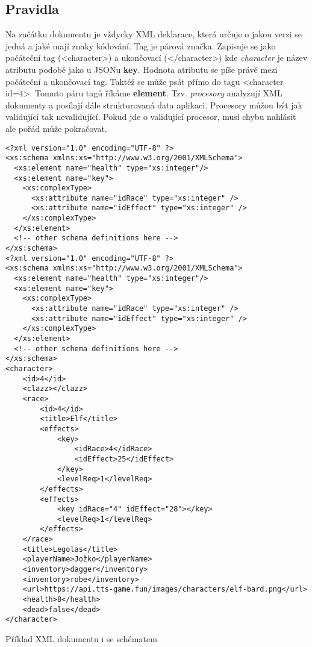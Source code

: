 \subsection{Pravidla}
Na začátku dokumentu je vždycky XML deklarace, která určuje o jakou verzi se jedná a jaké mají znaky kódování.
Tag je párová značka. Zapisuje se jako počáteční tag (<character>) a ukončovací (</character>) kde \textit{character} je název atributu podobě jako u JSONu \textbf{key}. Hodnota atributu se píše právě mezi počáteční a ukončovací tag. Taktéž se může psát přímo do tagu <character id=4>. Tomuto páru tagů říkáme \textbf{element}. Tzv. \textit{procesory} analyzují XML dokumenty a posílají dále strukturovaná data aplikaci. Procesory můžou být jak validující tak nevalidující. Pokud jde o validující procesor, musí chybu nahlásit ale pořád může pokračovat.


\begin{listing}
    \begin{verbatim}
<?xml version="1.0" encoding="UTF-8" ?>
<xs:schema xmlns:xs="http://www.w3.org/2001/XMLSchema">
  <xs:element name="health" type="xs:integer"/>
  <xs:element name="key">
    <xs:complexType>
      <xs:attribute name="idRace" type="xs:integer" />
      <xs:attribute name="idEffect" type="xs:integer" />
    </xs:complexType>
  </xs:element>
  <!-- other schema definitions here -->
</xs:schema>
<?xml version="1.0" encoding="UTF-8" ?>
<xs:schema xmlns:xs="http://www.w3.org/2001/XMLSchema">
  <xs:element name="health" type="xs:integer"/>
  <xs:element name="key">
    <xs:complexType>
      <xs:attribute name="idRace" type="xs:integer" />
      <xs:attribute name="idEffect" type="xs:integer" />
    </xs:complexType>
  </xs:element>
  <!-- other schema definitions here -->
</xs:schema>
<character> 
    <id>4</id>
    <clazz></clazz>
    <race>
        <id>4</id>
        <title>Elf</title>
        <effects>
            <key>
                <idRace>4</idRace>
                <idEffect>25</idEffect>
            </key>
            <levelReq>1</levelReq>
        </effects>
        <effects>
            <key idRace="4" idEffect="28"></key>
            <levelReq>1</levelReq>
        </effects>
    </race>
    <title>Legolas</title>
    <playerName>Jožko</playerName>
    <inventory>dagger</inventory>
    <inventory>robe</inventory>
    <url>https://api.tts-game.fun/images/characters/elf-bard.png</url>
    <health>8</health>
    <dead>false</dead>
</character>
  \end{verbatim}
    \caption{Příklad XML dokumentu i se schématem}
\end{listing}

